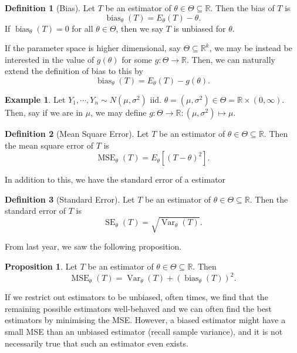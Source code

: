 \documentclass[
]{article}
\theoremstyle{definition}
\newtheorem{prop}{Proposition}
\newtheorem{example}{Example}
\theoremstyle{definition}
\newtheorem{definition}{Definition}[section]
\begin{document}
\begin{definition}[Bias]
  Let \(T\) be an estimator of \(\theta \in \Theta \subseteq \mathbb{R}\). Then 
  the bias of \(T\) is 
  \[{\mathop{\mathrm{bias}}}_{\theta}(T) = E_\theta(T) - \theta.\]
  If \({\mathop{\mathrm{bias}}}_{\theta}(T) = 0\) for all \(\theta \in \Theta\), then we say \(T\) is 
  unbiased for \(\theta\).
\end{definition}

If the parameter space is higher dimensional, say
\(\Theta \subseteq \mathbb{R}^k\), we may be instead be interested in
the value of \(g(\theta)\) for some \(g : \Theta \to \mathbb{R}\). Then,
we can naturally extend the definition of bias to this by
\[{\mathop{\mathrm{bias}}}_{\theta}(T) = E_\theta(T) - g(\theta).\]

\begin{example}
  Let \(Y_1, \cdots, Y_n \sim N(\mu, \sigma^2)\) iid. 
  \(\theta = (\mu, \sigma^2) \in \Theta = \mathbb{R} \times (0, \infty)\). Then, 
  say if we are in \(\mu\), we may define \(g : \Theta \to \mathbb{R} : 
  (\mu, \sigma^2) \mapsto \mu\).
\end{example}
\begin{definition}[Mean Square Error]
  Let \(T\) be an estimator of \(\theta \in \Theta \subseteq \mathbb{R}\). Then 
  the mean square error of \(T\) is 
  \[{\mathop{\mathrm{MSE}}}_{\theta}(T) = E_\theta[(T - \theta)^2].\]
\end{definition}

In addition to this, we have the standard error of a estimator

\begin{definition}[Standard Error]
  Let \(T\) be an estimator of \(\theta \in \Theta \subseteq \mathbb{R}\). Then 
  the standard error of \(T\) is 
  \[{\mathop{\mathrm{SE}}}_{\theta}(T) = \sqrt{{\mathop{\mathrm{Var}}}_\theta(T)}.\]
\end{definition}

From last year, we saw the following proposition.

\begin{prop}
  Let \(T\) be an estimator of \(\theta \in \Theta \subseteq \mathbb{R}\). Then 
  \[{\mathop{\mathrm{MSE}}}_{\theta}(T) = {\mathop{\mathrm{Var}}}_\theta(T) + ({\mathop{\mathrm{bias}}}_{\theta}(T))^2.\]
\end{prop}

If we restrict out estimators to be unbiased, often times, we find that
the remaining possible estimators well-behaved and we can often find the
best estimators by minimising the MSE. However, a biased estimator might
have a small MSE than an unbiased estimator (recall sample variance),
and it is not necessarily true that such an estimator even exists.
\end{document}
